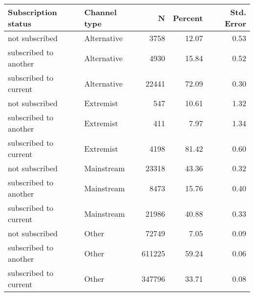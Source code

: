 \begin{table}
\centering
\begin{tabular}[t]{llrrr}
\toprule
Subscription status & Channel type & N & Percent & Std. Error\\
\midrule
not subscribed & Alternative & 3758 & 12.07 & 0.53\\
subscribed to another & Alternative & 4930 & 15.84 & 0.52\\
subscribed to current & Alternative & 22441 & 72.09 & 0.30\\
not subscribed & Extremist & 547 & 10.61 & 1.32\\
subscribed to another & Extremist & 411 & 7.97 & 1.34\\
\addlinespace
subscribed to current & Extremist & 4198 & 81.42 & 0.60\\
not subscribed & Mainstream & 23318 & 43.36 & 0.32\\
subscribed to another & Mainstream & 8473 & 15.76 & 0.40\\
subscribed to current & Mainstream & 21986 & 40.88 & 0.33\\
not subscribed & Other & 72749 & 7.05 & 0.09\\
\addlinespace
subscribed to another & Other & 611225 & 59.24 & 0.06\\
subscribed to current & Other & 347796 & 33.71 & 0.08\\
\bottomrule
\end{tabular}
\end{table}
